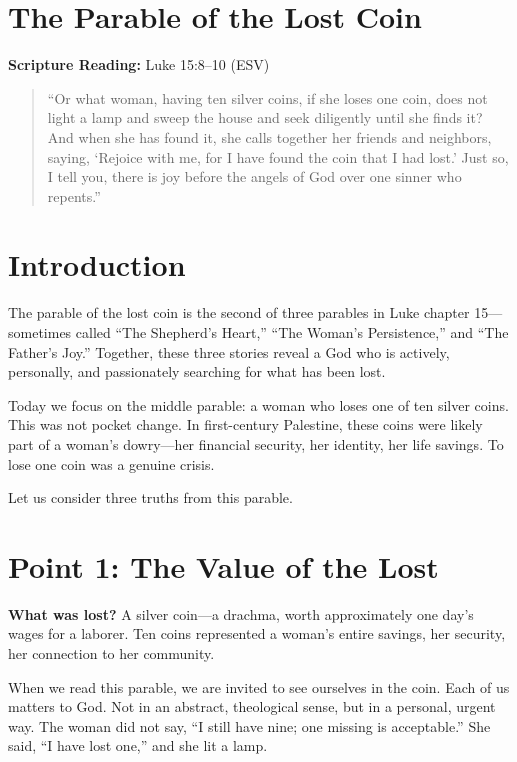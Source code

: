 \documentclass[
    language=english,
    doctype=sermon,
    institution=none,
]{../../omnilatex}
\begin{document}
\maketitle

\section{The Parable of the Lost Coin}

\textbf{Scripture Reading:} Luke 15:8--10 (ESV)

\begin{quote}
``Or what woman, having ten silver coins, if she loses one coin, does not light a lamp and sweep the house and seek diligently until she finds it? And when she has found it, she calls together her friends and neighbors, saying, `Rejoice with me, for I have found the coin that I had lost.' Just so, I tell you, there is joy before the angels of God over one sinner who repents.''
\end{quote}

\section{Introduction}

The parable of the lost coin is the second of three parables in Luke chapter 15---sometimes called ``The Shepherd's Heart,'' ``The Woman's Persistence,'' and ``The Father's Joy.'' Together, these three stories reveal a God who is actively, personally, and passionately searching for what has been lost.

Today we focus on the middle parable: a woman who loses one of ten silver coins. This was not pocket change. In first-century Palestine, these coins were likely part of a woman's dowry---her financial security, her identity, her life savings. To lose one coin was a genuine crisis.

Let us consider three truths from this parable.

\section{Point 1: The Value of the Lost}

\textbf{What was lost?} A silver coin---a drachma, worth approximately one day's wages for a laborer. Ten coins represented a woman's entire savings, her security, her connection to her community.

When we read this parable, we are invited to see ourselves in the coin. Each of us matters to God. Not in an abstract, theological sense, but in a personal, urgent way. The woman did not say, ``I still have nine; one missing is acceptable.'' She said, ``I have lost one,'' and she lit a lamp.
\end{document}
